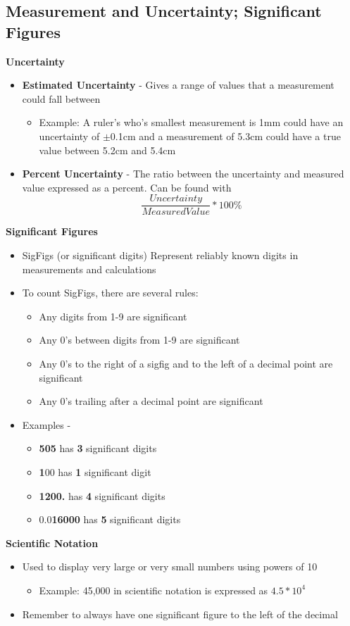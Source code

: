 \subsection{Measurement and Uncertainty; Significant Figures}
\textbf{Uncertainty}
    \begin{itemize}
		\item \textbf{Estimated Uncertainty} - Gives a range of values that a measurement could fall between
        \begin{itemize}
            \item Example: A ruler's who's smallest measurement is 1mm could have an uncertainty of \(\pm\)0.1cm and a measurement of 5.3cm could have a true value between 5.2cm and 5.4cm
        \end{itemize}
        \item \textbf{Percent Uncertainty} - The ratio between the uncertainty and measured value expressed as a percent. Can be found with
        \[\frac{Uncertainty}{Measured Value}*100\%\]
    \end{itemize}
\textbf{Significant Figures}
	\begin{itemize}
		\item SigFigs (or significant digits) Represent reliably known digits in measurements and calculations
		\item To count SigFigs, there are several rules:
		\begin{itemize}
		   \item Any digits from 1-9 are significant
		   \item Any 0's between digits from 1-9 are significant
		   \item Any 0's to the right of a sigfig and to the left of a decimal point are significant
		   \item Any 0's trailing after a decimal  point are significant
        \end{itemize}
        \item Examples -
        \begin{itemize}
            \item \textbf{505} has \textbf{3} significant digits
            \item \textbf{1}00 has \textbf{1} significant digit
            \item \textbf{1200.} has \textbf{4} significant digits
            \item 0.0\textbf{16000} has \textbf{5} significant digits
        \end{itemize}
	\end{itemize}
\textbf{Scientific Notation}
    \begin{itemize}
        \item Used to display very large or very small numbers using powers of 10
        
        \begin{itemize}
            \item Example: 45,000 in scientific notation is expressed as \(4.5*10^4\)
        \end{itemize}
        \item Remember to always have one significant figure to the left of the decimal
    \end{itemize}
    
